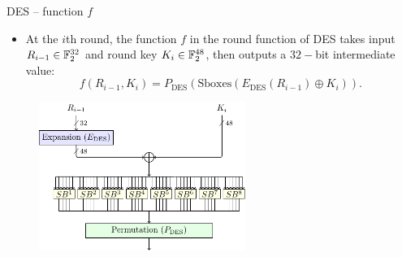 \begin{frame}{DES -- function $f$}
    \begin{itemize}
        \item At the $i$th round, the function $f$ in the round function of DES takes input $R_{i-1}\in{\mathbb F}_2^{32}$ and round key $K_i\in{\mathbb F}_2^{48}$, then outputs a $32-$bit intermediate value:
\[
    f(R_{i-1},K_i)=P_{\text{DES}}(\text{Sboxes}(E_{\text{DES}}(R_{i-1})\oplus K_i)).
\]
    \end{itemize}
\begin{figure}
    \centering
    \includegraphics[width=0.6\textwidth]{fig/DES_F.pdf}
\end{figure}
\end{frame}

